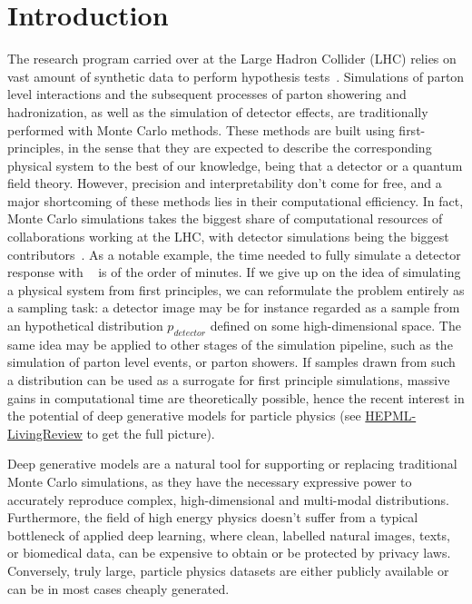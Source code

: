 %
%
%

\chapter{Introduction}\label{chap:introduction}
\enlargethispage{2ex}
\vspace*{-2pt}

The research program carried over at the Large Hadron Collider (LHC) relies on vast amount of synthetic data to perform hypothesis tests~\cite{Apostolakis:2308666, Aarrestad:2729448, Calafiura:2729668, ATL-SOFT-PUB-2018-002}. Simulations of parton level interactions and the subsequent processes of parton showering and hadronization, as well as the simulation of detector effects, are traditionally performed with Monte Carlo methods. These methods are built using first-principles, in the sense that they are expected to describe the corresponding physical system to the best of our knowledge, being that a detector or a quantum field theory. 
However, precision and interpretability don't come for free, and a major shortcoming of these methods lies in their computational efficiency. In fact, Monte Carlo simulations takes the biggest share of computational resources of collaborations working at the LHC, with detector simulations being the biggest contributors~\cite{Calafiura:2729668}. As a notable example, the time needed to fully simulate a detector response with \geant~\cite{AGOSTINELLI2003250} is of the order of minutes.
If we give up on the idea of simulating a physical system from first principles, we can reformulate the problem entirely as a sampling task: a detector image may be for instance regarded as a sample from an hypothetical distribution $p_{detector}$ defined on some high-dimensional space. The same idea may be applied to other stages of the simulation pipeline, such as the simulation of parton level events, or parton showers.
If samples drawn from such a distribution can be used as a surrogate for first principle simulations, massive gains in computational time are theoretically possible, hence the recent interest in the potential of deep generative models for particle physics (see \href{https://iml-wg.github.io/HEPML-LivingReview}{HEPML-LivingReview} to get the full picture).

Deep generative models are a natural tool for supporting  or replacing traditional Monte Carlo simulations, as they have the necessary expressive power to accurately reproduce complex, high-dimensional and multi-modal distributions. Furthermore, the field of high energy physics doesn't suffer from a typical bottleneck of applied deep learning, where clean, labelled natural images, texts, or biomedical data, can be expensive to obtain or be protected by privacy laws. Conversely, truly large, particle physics datasets are either publicly available or can be in most cases cheaply generated.

